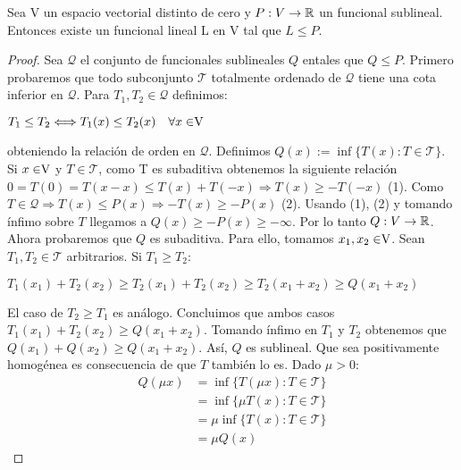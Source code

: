 	\begin{teoremaBox}\label{H-B}
		Sea V un espacio vectorial distinto de cero y $P:V \rightarrow \mathbb{R}$ un funcional sublineal. Entonces existe un funcional lineal L en V tal que $ L \leq P $.
	\end{teoremaBox}
	\begin{proof}
		Sea $ \mathcal{Q} $ el conjunto de funcionales sublineales $ Q $ en\vecSpace tales que $ Q \leq P $. Primero probaremos que todo subconjunto $ \mathcal{T} $ totalmente ordenado de $ \mathcal{Q} $ tiene una cota inferior en $ \mathcal{Q} $. Para $ T_1 ,T_2 \in \mathcal{Q} $ definimos:
		\begin{center}
			$ T_1 \leq T_2 \Longleftrightarrow T_1 (x) \leq T_2 (x) \quad \forall x \in \vecSpace $
		\end{center}
		
		obteniendo la relación de orden en  $ \mathcal{Q} $. Definimos $ Q(x):=\inf \{ T(x): T \in \mathcal{T} \} $. Si $ x \in \vecSpace $ y $ T \in \mathcal{T} $, como T es subaditiva obtenemos la siguiente relación $ 0 = T(0) = T(x-x) \leq T(x) + T(-x) \Longrightarrow T(x) \geq -T(-x) $ (1). Como $ T \in \mathcal{Q} \Longrightarrow T(x) \leq P(x) \Longrightarrow -T(x) \geq -P(x)$ (2). Usando (1), (2) y tomando ínfimo sobre $  T $  llegamos a $ Q(x) \geq -P(x) \geq - \infty $. Por lo tanto $ Q:V \rightarrow \mathbb{R}$. \\
		
		Ahora probaremos que $ Q $ es subaditiva. Para ello, tomamos $ x_1, x_2\in \vecSpace $. Sean $ T_1 , T_2 \in \mathcal{T} $ arbitrarios. Si $ T_1 \geq T_2 $:
		
		\begin{center}
			$ T_1 (x_1)+  T_2 (x_2) \geq T_2(x_1)+  T_2 (x_2) \geq T_2(x_1 +x_2) \geq Q(x_1 + x_2)$
		\end{center}
		
		El caso de $ T_2 \geq T_1 $ es análogo. Concluimos que ambos casos $ T_1 (x_1)+  T_2 (x_2) \geq Q(x_1 + x_2)$. Tomando ínfimo en $ T_1 $ y $ T_2 $ obtenemos que $ Q (x_1)+  Q(x_2) \geq Q(x_1 + x_2)$. Así, $ Q $ es sublineal. Que sea positivamente homogénea es consecuencia de que $ T $ también lo es. Dado $ \mu > 0 $:
		\begin{equation*}
		\begin{split}
		Q(\mu x) &=\inf \{ T(\mu x): T \in \mathcal{T} \} \\ 
		& = \inf \{ \mu T( x): T \in \mathcal{T} \} \\ 
		&= \mu\inf \{ T( x): T \in \mathcal{T} \} \\ 
		&= \mu Q(x) 
		\end{split}
		\end{equation*}
		

\end{proof}
